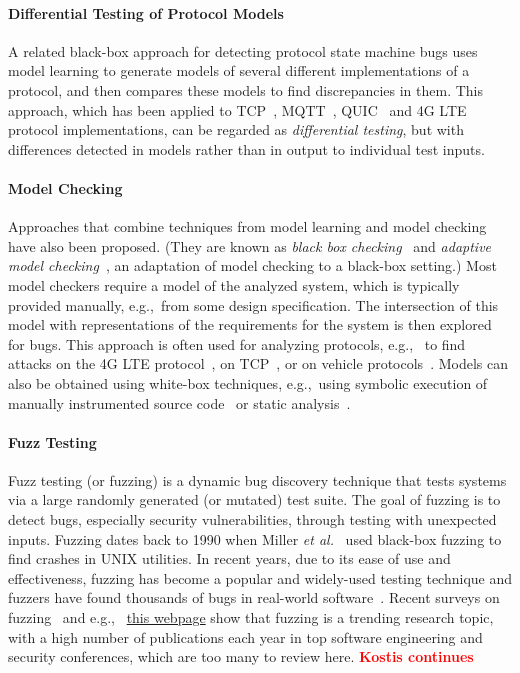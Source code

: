 \documentclass[11pt]{article}
\newcommand{\FIX}[1]{\textcolor{red}{\textbf{#1}}}
\newcommand{\myparagraph}{}
\let\myparagraph=\paragraph
\renewcommand{\paragraph}{\vspace{-3mm}\myparagraph}
\newcommand{\eg}{e.\/g.,\ }
\newcommand{\etal}{\textit{et al.}}
\begin{document}
\paragraph{Differential Testing of Protocol Models}
A related black-box approach for detecting protocol state machine bugs uses
model learning to generate models of several different implementations of a
protocol, and then compares these models to find discrepancies in them.
%
This approach, which has been applied to TCP~\cite{SFADiff},
MQTT~\cite{Tappler@ICST-2017}, QUIC~\cite{Prognosis@SIGCOMM-21} and 4G
LTE~\cite{DIKEUE@CCS-21} protocol implementations, can be regarded as
\emph{differential testing}, but with differences detected in models rather
than in output to individual test inputs.

\paragraph{Model Checking}
Approaches that combine techniques from model learning and model
checking~\cite{MC:handbook} have also been proposed.
%
(They are known as \emph{black box checking}~\cite{BBC} and \emph{adaptive
model checking}~\cite{AdaptiveMC}, an adaptation of model checking to a
black-box setting.)
%
Most model checkers require a model of the analyzed system, which is typically
provided manually, \eg from some design specification.  The intersection of
this model with representations of the requirements for the system is then
explored for bugs.  This approach is often used for analyzing protocols, \eg
to find attacks on the 4G LTE protocol~\cite{LTEInspector}, on
TCP~\cite{Jero@DSN-15}, or on vehicle protocols~\cite{Hu:usenix21}.
Models can also be obtained using white-box techniques, \eg using symbolic
execution of manually instrumented source code~\cite{Hoque@DSN-17,Themis:ccs21}
or static analysis~\cite{Cao:ccs19}.

\paragraph{Fuzz Testing}
Fuzz testing (or fuzzing) is a dynamic bug discovery technique that tests
systems via a large randomly generated (or mutated) test suite. The goal of
fuzzing is to detect bugs, especially security vulnerabilities, through
testing with unexpected inputs. Fuzzing dates back to 1990 when Miller
\etal~\cite{Fuzz@CACM-90} used black-box fuzzing to find crashes in UNIX
utilities. In recent years, due to its ease of use and effectiveness, fuzzing
has become a popular and widely-used testing technique and fuzzers have found
thousands of bugs in real-world software~\cite{AFL}. Recent surveys on
fuzzing~\cite{FuzzingSurvey@TSE-21,FuzzingRoadmap@CompSurveys-22} and \eg
\href{https://wcventure.github.io/FuzzingPaper/}{this webpage} show that
fuzzing is a trending research topic, with a high number of publications each
year in top software engineering and security conferences, which are too many
to review here. \FIX{Kostis continues}
\end{document}

